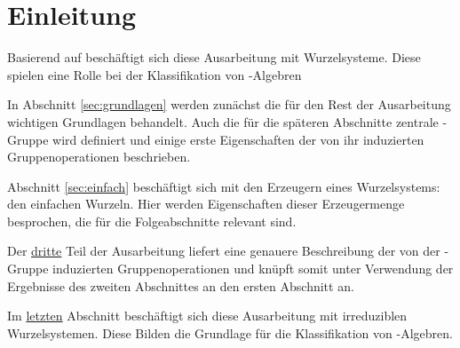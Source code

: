 \section*{Einleitung}

Basierend auf \cite[S.49-55]{humphreys1972introduction} beschäftigt sich diese Ausarbeitung mit Wurzelsysteme. 
Diese spielen eine Rolle bei der Klassifikation von \lie\hyp{}Algebren

In Abschnitt \ref{sec:grundlagen} werden zunächst die für den Rest der Ausarbeitung wichtigen Grundlagen behandelt.
Auch die für die späteren Abschnitte zentrale \weyl\hyp{}Gruppe wird definiert und einige erste Eigenschaften der von ihr induzierten Gruppenoperationen beschrieben.

Abschnitt \ref{sec:einfach} beschäftigt sich mit den Erzeugern eines Wurzelsystems: den einfachen Wurzeln. 
Hier werden Eigenschaften dieser Erzeugermenge besprochen, die für die Folgeabschnitte relevant sind.

Der \hyperref[sec:weylgroup]{dritte} Teil der Ausarbeitung liefert eine genauere Beschreibung der von der \weyl\hyp{}Gruppe induzierten Gruppenoperationen und knüpft somit unter Verwendung der Ergebnisse des zweiten Abschnittes an den ersten Abschnitt an.

Im \hyperref[sec:irreduc]{letzten} Abschnitt beschäftigt sich diese Ausarbeitung mit irreduziblen Wurzelsystemen. 
Diese Bilden die Grundlage für die Klassifikation von \lie\hyp{}Algebren.
